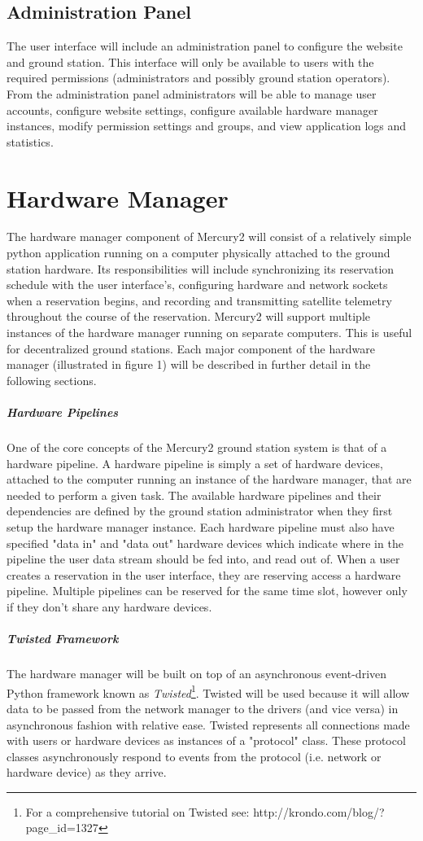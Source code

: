 \documentclass{mxl-design}
\begin{document}
\subsection{Administration Panel}
The user interface will include an administration panel to configure the website and ground station. This interface will only be available to users with the required permissions (administrators and possibly ground station operators). From the administration panel administrators will be able to manage user accounts, configure website settings, configure available hardware manager instances, modify permission settings and groups, and view application logs and statistics.

\section{Hardware Manager}
The hardware manager component of Mercury2 will consist of a relatively simple python application running on a computer physically attached to the ground station hardware. Its responsibilities will include synchronizing its reservation schedule with the user interface's, configuring hardware and network sockets when a reservation begins, and recording and transmitting satellite telemetry throughout the course of the reservation. Mercury2 will support multiple instances of the hardware manager running on separate computers. This is useful for decentralized ground stations. Each major component of the hardware manager (illustrated in figure 1) will be described in further detail in the following sections. 

\subparagraph{Hardware Pipelines}
One of the core concepts of the Mercury2 ground station system is that of a hardware pipeline. A hardware pipeline is simply a set of hardware devices, attached to the computer running an instance of the hardware manager, that are needed to perform a given task. The available hardware pipelines and their dependencies are defined by the ground station administrator when they first setup the hardware manager instance. Each hardware pipeline must also have specified "data in" and "data out" hardware devices which indicate where in the pipeline the user data stream should be fed into, and read out of. When a user creates a reservation in the user interface, they are reserving access a hardware pipeline. Multiple pipelines can be reserved for the same time slot, however only if they don't share any hardware devices.

\subparagraph{Twisted Framework}
The hardware manager will be built on top of an asynchronous event-driven Python framework known as \textit{Twisted}\footnote{For a comprehensive tutorial on Twisted see: http://krondo.com/blog/?page\_id=1327}. Twisted will be used because it will allow data to be passed from the network manager to the drivers (and vice versa) in asynchronous fashion with relative ease. Twisted represents all connections made with users or hardware devices as instances of a "protocol" class. These protocol classes asynchronously respond to events from the protocol (i.e. network or hardware device) as they arrive.
\end{document}
